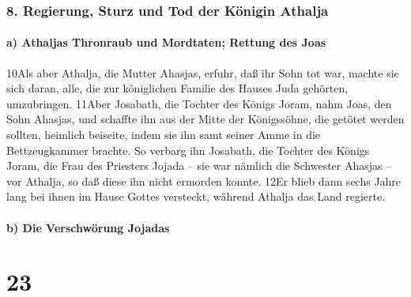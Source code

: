 \hypertarget{regierung-sturz-und-tod-der-kuxf6nigin-athalja}{%
\subsubsection{8. Regierung, Sturz und Tod der Königin
Athalja}\label{regierung-sturz-und-tod-der-kuxf6nigin-athalja}}

\hypertarget{a-athaljas-thronraub-und-mordtaten-rettung-des-joas}{%
\paragraph{a) Athaljas Thronraub und Mordtaten; Rettung des
Joas}\label{a-athaljas-thronraub-und-mordtaten-rettung-des-joas}}

10Als aber Athalja, die Mutter Ahasjas, erfuhr, daß ihr Sohn tot war,
machte sie sich daran, alle, die zur königlichen Familie des Hauses Juda
gehörten, umzubringen. 11Aber Josabath, die Tochter des Königs Joram,
nahm Joas, den Sohn Ahasjas, und schaffte ihn aus der Mitte der
Königssöhne, die getötet werden sollten, heimlich beiseite, indem sie
ihn samt seiner Amme in die Bettzeugkammer brachte. So verbarg ihn
Josabath, die Tochter des Königs Joram, die Frau des Priesters Jojada --
sie war nämlich die Schwester Ahasjas -- vor Athalja, so daß diese ihn
nicht ermorden konnte. 12Er blieb dann sechs Jahre lang bei ihnen im
Hause Gottes versteckt, während Athalja das Land regierte.

\hypertarget{b-die-verschwuxf6rung-jojadas}{%
\paragraph{b) Die Verschwörung
Jojadas}\label{b-die-verschwuxf6rung-jojadas}}

\hypertarget{section-22}{%
\section{23}\label{section-22}}

